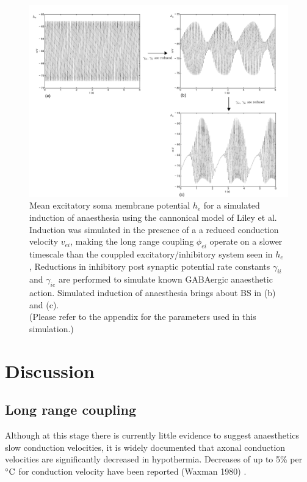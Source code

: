 \documentclass[a4paper,12pt]{article}
\begin{document}
\begin{figure}
	\includegraphics[scale=0.75]{frontiers-2012-working-images/figure-5-phi.pdf}

	\label{fig:phi_fast_var}
	\caption{Mean excitatory soma membrane potential $h_e$ for a simulated induction of anaesthesia using the cannonical model of Liley et al. Induction was simulated in the presence of a a reduced conduction velocity $v_{ei}$, making the long range coupling $\phi_{ei}$ operate on a slower timescale than the couppled excitatory/inhibitory system seen in $h_e$ ,
Reductions in inhibitory post synaptic potential rate constants $\gamma_{ii}$ and $\gamma_{ie}$ are performed to simulate known GABAergic anaesthetic action. Simulated induction of anaesthesia brings about BS in (b) and (c).\\
	(Please refer to the appendix for the parameters used in this simulation.)}
\end{figure}


\section{Discussion}

\subsection{Long range coupling}
Although at this stage there is currently little evidence to suggest anaesthetics slow conduction velocities, it is
widely documented that axonal conduction velocities are significantly decreased in hypothermia. Decreases of up to 5\%
per $^{\circ}{\rm C}$ for conduction velocity have been reported (Waxman 1980) .
\end{document}
